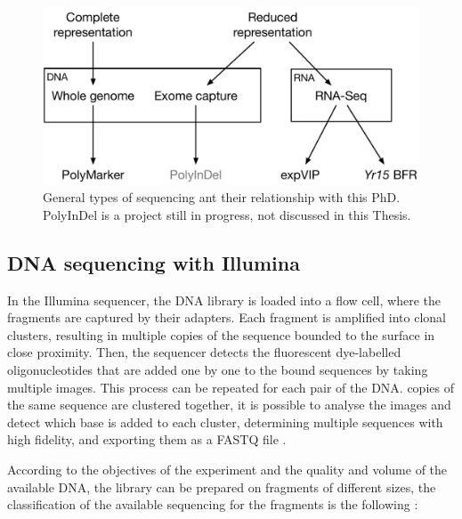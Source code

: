 


\begin{figure}
\includegraphics[width=1\textwidth]{LitReview/Figures/typesOfSequencing.pdf}
\caption{General types of sequencing ant their relationship with this PhD. PolyInDel is a project still in progress, not discussed in this Thesis. }
\end{figure}
\subsection{DNA sequencing with Illumina}

In the Illumina sequencer, the DNA library is loaded into a flow cell, where the fragments are captured by their adapters. 
Each fragment is amplified into clonal clusters, resulting in multiple copies of the sequence bounded to the surface in close proximity. 
Then, the sequencer detects the fluorescent dye-labelled oligonucleotides that are added one by one to the bound sequences by taking multiple images. 
This process can be repeated for each pair of the DNA. 
copies of the same sequence are clustered together, it is possible to analyse the images and detect which base is added to each cluster, determining multiple sequences with high fidelity, and exporting them as a FASTQ file \cite{RNAseqlopedia, truseq}.


According to the objectives of the experiment and the quality and volume of the available DNA, the library can be prepared on fragments of different sizes, the classification of the available sequencing for the fragments is the following \cite{Myllykangas2012,Metzker2010,Shendure2008,Hutchison2007}:

